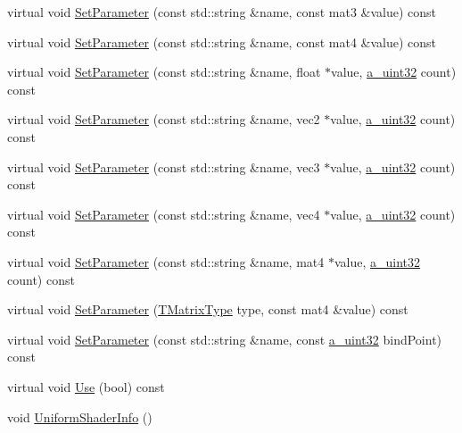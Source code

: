 \begin{DoxyCompactItemize}
virtual void \hyperlink{class_agmd_1_1_g_l_shader_program_adb33e492f368339eede25139a92ac0ef}{Set\+Parameter} (const std\+::string \&name, const mat3 \&value) const 
\item 
virtual void \hyperlink{class_agmd_1_1_g_l_shader_program_a991426fcc77c9c2733817599f1c92080}{Set\+Parameter} (const std\+::string \&name, const mat4 \&value) const 
\item 
virtual void \hyperlink{class_agmd_1_1_g_l_shader_program_a271620e20bc3a018b10fd348b272f0ff}{Set\+Parameter} (const std\+::string \&name, float $\ast$value, \hyperlink{_common_defines_8h_a964296f9770051b9e4807b1f180dd416}{a\+\_\+uint32} count) const 
\item 
virtual void \hyperlink{class_agmd_1_1_g_l_shader_program_a634511e00e93ea9b64ac82e4f76acaef}{Set\+Parameter} (const std\+::string \&name, vec2 $\ast$value, \hyperlink{_common_defines_8h_a964296f9770051b9e4807b1f180dd416}{a\+\_\+uint32} count) const 
\item 
virtual void \hyperlink{class_agmd_1_1_g_l_shader_program_a2119ed809c2c70ae35ea0fd4a8d00dcc}{Set\+Parameter} (const std\+::string \&name, vec3 $\ast$value, \hyperlink{_common_defines_8h_a964296f9770051b9e4807b1f180dd416}{a\+\_\+uint32} count) const 
\item 
virtual void \hyperlink{class_agmd_1_1_g_l_shader_program_a4a6e184647b3755c10c1b3eba5fd1bc5}{Set\+Parameter} (const std\+::string \&name, vec4 $\ast$value, \hyperlink{_common_defines_8h_a964296f9770051b9e4807b1f180dd416}{a\+\_\+uint32} count) const 
\item 
virtual void \hyperlink{class_agmd_1_1_g_l_shader_program_a30df3fe9ff0e069241e37c553d7f9b71}{Set\+Parameter} (const std\+::string \&name, mat4 $\ast$value, \hyperlink{_common_defines_8h_a964296f9770051b9e4807b1f180dd416}{a\+\_\+uint32} count) const 
\item 
virtual void \hyperlink{class_agmd_1_1_g_l_shader_program_a489431df7e86ed6c033b3f9b0e5e0dfd}{Set\+Parameter} (\hyperlink{namespace_agmd_aa7eba958a8a0e3ac4586f75298e122b1}{T\+Matrix\+Type} type, const mat4 \&value) const 
\item 
virtual void \hyperlink{class_agmd_1_1_g_l_shader_program_a90f0d9e3482cfa6fa2de91ddc41f4599}{Set\+Parameter} (const std\+::string \&name, const \hyperlink{_common_defines_8h_a964296f9770051b9e4807b1f180dd416}{a\+\_\+uint32} bind\+Point) const 
\item 
virtual void \hyperlink{class_agmd_1_1_g_l_shader_program_a399ab53f412b46004ad4a7e585a0a863}{Use} (bool) const 
\item 
void \hyperlink{class_agmd_1_1_g_l_shader_program_aed6218826ff94cd10bfd7cca96b40dbc}{Uniform\+Shader\+Info} ()
\end{DoxyCompactItemize}

